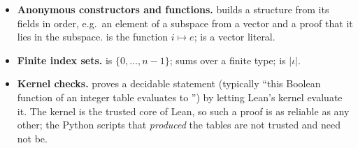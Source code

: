 \begin{itemize}
\item \textbf{Anonymous constructors and functions.}  builds a structure from its fields in order, e.g.\ an element
  of a subspace from a vector  and a proof  that it lies in the subspace.  is the function
  $i\mapsto e$; \lean{![a, b, c]} is a vector literal.
\item \textbf{Finite index sets.}  is $\{0,\dots,n-1\}$;  sums over a finite type;  is $|\iota|$.
\item \textbf{Kernel checks.}  proves a decidable statement (typically ``this Boolean function of an integer
  table evaluates to '') by letting Lean's kernel evaluate it. The kernel is the trusted core of Lean, so such a
  proof is as reliable as any other; the Python scripts that \emph{produced} the tables are not trusted and need not be.
\end{itemize}

